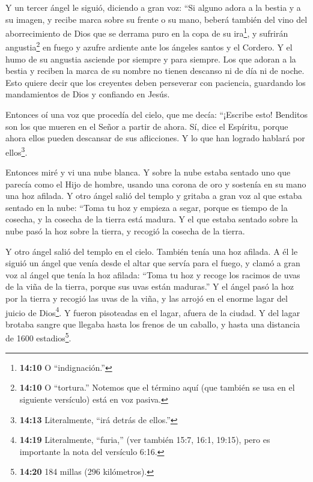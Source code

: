  Y un tercer ángel le siguió, diciendo a gran voz: ``Si
alguno adora a la bestia y a su imagen, y recibe marca sobre su frente o
su mano,  beberá también del vino del aborrecimiento de
Dios que se derrama puro en la copa de su ira\footnote{\textbf{14:10} O
  ``indignación.''}, y sufrirán angustia\footnote{\textbf{14:10} O
  ``tortura.'' Notemos que el término aquí (que también se usa en el
  siguiente versículo) está en voz pasiva.} en fuego y azufre ardiente
ante los ángeles santos y el Cordero.  Y el humo de su
angustia asciende por siempre y para siempre. Los que adoran a la bestia
y reciben la marca de su nombre no tienen descanso ni de día ni de
noche.  Esto quiere decir que los creyentes deben
perseverar con paciencia, guardando los mandamientos de Dios y confiando
en Jesús.

 Entonces oí una voz que procedía del cielo, que me decía:
``¡Escribe esto! Benditos son los que mueren en el Señor a partir de
ahora. Sí, dice el Espíritu, porque ahora ellos pueden descansar de sus
aflicciones. Y lo que han logrado hablará por ellos\footnote{\textbf{14:13}
  Literalmente, ``irá detrás de ellos.''}.

 Entonces miré y vi una nube blanca. Y sobre la nube estaba
sentado uno que parecía como el Hijo de hombre, usando una corona de oro
y sostenía en su mano una hoz afilada.  Y otro ángel salió
del templo y gritaba a gran voz al que estaba sentado en la nube: ``Toma
tu hoz y empieza a segar, porque es tiempo de la cosecha, y la cosecha
de la tierra está madura.  Y el que estaba sentado sobre la
nube pasó la hoz sobre la tierra, y recogió la cosecha de la tierra.

 Y otro ángel salió del templo en el cielo. También tenía
una hoz afilada.  A él le siguió un ángel que venía desde
el altar que servía para el fuego, y clamó a gran voz al ángel que tenía
la hoz afilada: ``Toma tu hoz y recoge los racimos de uvas de la viña de
la tierra, porque sus uvas están maduras.''  Y el ángel
pasó la hoz por la tierra y recogió las uvas de la viña, y las arrojó en
el enorme lagar del juicio de Dios\footnote{\textbf{14:19} Literalmente,
  ``furia,'' (ver también 15:7, 16:1, 19:15), pero es importante la nota
  del versículo 6:16.}.  Y fueron pisoteadas en el lagar,
afuera de la ciudad. Y del lagar brotaba sangre que llegaba hasta los
frenos de un caballo, y hasta una distancia de 1600 estadios\footnote{\textbf{14:20}
  184 millas (296 kilómetros).}.

